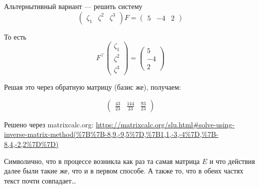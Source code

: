 \documentclass[12pt, a4paper]{article}
\begin{document}
    Альтернытивный вариант — решить систему \begin{equation}
        \begin{pmatrix} \zeta_1 & \zeta^2 & \zeta^3 \end{pmatrix} F = \left(\begin{matrix}
            5 & -4 & 2
        \end{matrix}\right)
    \end{equation}

    То есть 
    \begin{equation}
        F^\top \begin{pmatrix} \zeta_1 \\ \zeta^2 \\ \zeta^3 \end{pmatrix} = \left(\begin{matrix}
            5 \\ -4 \\ 2
        \end{matrix}\right)
    \end{equation}

    Решая это через обратную матрицу (базис же), получаем:

    \begin{equation}
        \left(\begin{matrix}
            \frac{43}{23} &
            \frac{144}{23} &
            \frac{93}{23}
        \end{matrix}\right)
    \end{equation}

    Решено через matrixcalc.org:
    \url{https://matrixcalc.org/slu.html#solve-using-inverse-matrix-method(%7B%7B-8,9,-9,5%7D,%7B1,1,-3,-4%7D,%7B-8,4,-2,2%7D%7D)}

    Символично, что в процессе возникла как раз та самая матрица $E$ и что действия далее были такие же, что и в первом способе.
    А также то, что в обеих частях текст почти совпадает…
\end{document}
